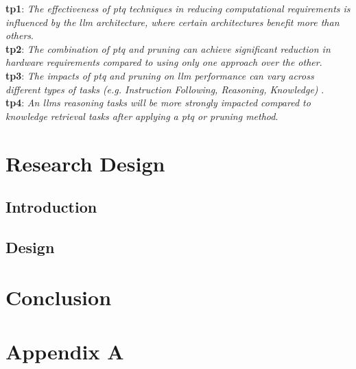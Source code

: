 \documentclass{ifacconf}
\begin{document}
	\textbf{\gls{tp}1}: \textit{The effectiveness of \gls{ptq} techniques in reducing computational requirements is influenced by the \gls{llm} architecture, where certain architectures benefit more than others}.\\
	
	
	\textbf{\gls{tp}2}: \textit{The combination of \gls{ptq} and pruning can achieve significant reduction in hardware requirements compared to using only one approach over the other}.\\
	
	\textbf{\gls{tp}3}: \textit{The impacts of \gls{ptq} and pruning on \gls{llm} performance can vary across different types of tasks (e.g. Instruction Following, Reasoning, Knowledge) }.\\
	
	\textbf{\gls{tp}4}: \textit{An \glspl{llm} reasoning tasks will be more strongly impacted compared to knowledge retrieval tasks after applying a \gls{ptq} or pruning method}.\\
	
	
	\section{Research Design}
	\subsection{Introduction}
	\subsection{Design}
	
	\section{Conclusion}
	
	
	
	\printglossary[title={Glossary}]
	
	\appendix
	\section{Appendix A}
\end{document}
